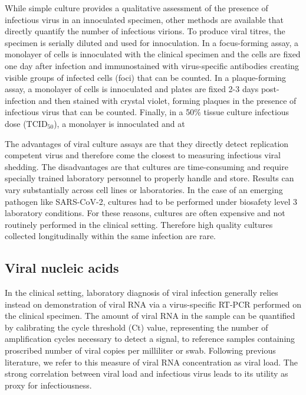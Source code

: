 \documentclass[12pt]{article}
\begin{document}
While simple culture provides a qualitative assessment of the presence of infectious virus in an innoculated specimen, other methods are available that directly quantify the number of infectious virions. To produce viral titres, the specimen is serially diluted and used for innoculation. In a focus-forming assay, a monolayer of cells is innoculated with the clinical specimen and the cells are fixed one day after infection and immunostained with virus-specific antibodies creating visible groups of infected cells (foci) that can be counted. In a plaque-forming assay, a monolayer of cells is innoculated and plates are fixed 2-3 days post-infection and then stained with crystal violet, forming plaques in the presence of infectious virus that can be counted. Finally, in a 
50\% tissue culture infectious dose (TCID$_{50}$), a monolayer is innoculated and at 

The advantages of viral culture assays are that they directly detect replication competent virus and therefore come the closest to measuring infectious viral shedding. The disadvantages are that cultures are time-consuming and require specially trained laboratory personnel to properly handle and store. Results can vary substantially across cell lines or laboratories. In the case of an emerging pathogen like SARS-CoV-2, cultures had to be performed under biosafety level 3 laboratory conditions. For these reasons, cultures are often expensive and not routinely performed in the clinical setting. Therefore high quality cultures collected longitudinally within the same infection are rare.

\subsection{Viral nucleic acids}
In the clinical setting, laboratory diagnosis of viral infection generally relies instead on demonstration of viral RNA via a virus-specific RT-PCR performed on the clinical specimen. The amount of viral RNA in the sample can be quantified by calibrating the cycle threshold (Ct) value, representing the number of amplification cycles necessary to detect a signal, to reference samples containing proscribed number of viral copies per milliliter or swab. Following previous literature, we refer to this measure of viral RNA concentration as viral load. The strong correlation between viral load and infectious virus leads to its utility as proxy for infectiousness.
\end{document}
